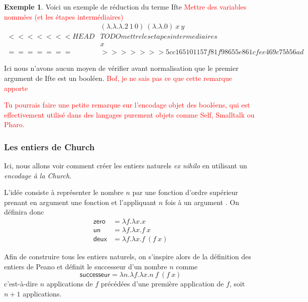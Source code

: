 \documentclass {article}
\theoremstyle{definition}
\newtheorem{example}{Exemple}
\theoremstyle{remark}
\newcommand{\todo}[1]{\textcolor{red}{#1}}
\begin{document}
\begin{example}
  Voici un exemple de réduction du terme Ifte \todo{Mettre des variables nommées (et les étapes intermédiaires)}
  \begin{align*}
    &(\lambda .\lambda .\lambda . 2\: 1\: 0) \: (\lambda . \lambda . 0) \: x \: y  \\
<<<<<<< HEAD
    & TODO mettre les etapes intermediaires \\
    & x \\
=======
    & %
>>>>>>> 5cc165101157f81f98655e861cfee469c75b56ad
  \end{align*}
\end{example}

Ici nous n'avons aucun moyen de vérifier avant normalisation que le premier
argument de Ifte est un booléen. \todo{Bof, je ne sais pas ce que cette remarque apporte} %

\todo{Tu pourrais faire une petite remarque sur l'encodage objet des
  booléens, qui est effectivement utilisé dans des langages purement
  objets comme Self, Smalltalk ou Pharo.}

\subsubsection{Les entiers de Church}

Ici, nous allons voir comment créer
les entiers naturels \textit{ex nihilo} en utilisant un \emph{encodage à
  la Church}.

L'idée consiste à représenter le nombre \(n\) par une fonction d'ordre
supérieur prenant en argument une fonction  et l'appliquant \(n\)
fois à un argument . On définira donc 
%
\begin{align*}
\mathsf{zero} &= \lambda f. \lambda x. x \\
\mathsf{un}   &= \lambda f. \lambda x. f\: x \\
\mathsf{deux} &= \lambda f. \lambda x. f\: (f\: x)
\end{align*}

Afin de construire tous les entiers naturels, on s'inspire alors de la
définition des entiers de Peano et définit le successeur d'un nombre \(n\)
comme
%
\[
\mathsf{successeur} = \lambda n. \lambda f. \lambda x. n\: f\: (f\: x)
\]
%
c'est-à-dire \(n\) applications de \(f\) précédées d'une première
application de \(f\), soit \(n+1\) applications.
\end{document}
